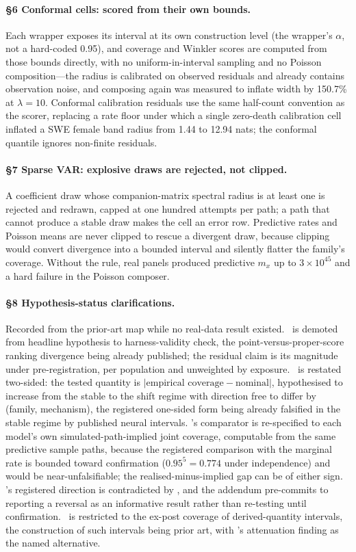 \paragraph{\S6 Conformal cells: scored from their own bounds.} Each wrapper
exposes its interval at its own construction level (the wrapper's $\alpha$,
not a hard-coded 0.95), and coverage and Winkler scores are computed from
those bounds directly, with no uniform-in-interval sampling and no Poisson
composition---the radius is calibrated on observed residuals and already
contains observation noise, and composing again was measured to inflate width
by 150.7\% at $\lambda=10$. Conformal calibration residuals use the same
half-count convention as the scorer, replacing a rate floor under which a
single zero-death calibration cell inflated a SWE female band radius from
1.44 to 12.94 nats; the conformal quantile ignores non-finite residuals.

\paragraph{\S7 Sparse VAR: explosive draws are rejected, not clipped.} A
coefficient draw whose companion-matrix spectral radius is at least one is
rejected and redrawn, capped at one hundred attempts per path; a path that
cannot produce a stable draw makes the cell an error row. Predictive rates and
Poisson means are never clipped to rescue a divergent draw, because clipping
would convert divergence into a bounded interval and silently flatter the
family's coverage. Without the rule, real panels produced predictive $m_x$ up
to $3\times10^{45}$ and a hard failure in the Poisson composer.

\paragraph{\S8 Hypothesis-status clarifications.} Recorded from the prior-art
map while no real-data result existed. \Hone\ is demoted from headline
hypothesis to harness-validity check, the point-versus-proper-score ranking
divergence being already published; the residual claim is its magnitude under
pre-registration, per population and unweighted by exposure. \Htwo\ is
restated two-sided: the tested quantity is
$|\text{empirical coverage}-\text{nominal}|$, hypothesised to increase from
the stable to the shift regime with direction free to differ by (family,
mechanism), the registered one-sided form being already falsified in the
stable regime by published neural intervals. \Hthree's comparator is
re-specified to each model's own simulated-path-implied joint coverage,
computable from the same predictive sample paths, because the registered
comparison with the marginal rate is bounded toward confirmation
($0.95^5=0.774$ under independence) and would be near-unfalsifiable; the
realised-minus-implied gap can be of either sign. \Hfour's registered
direction is contradicted by \citet{dowd2010backtesting}, and the addendum
pre-commits to reporting a reversal as an informative result rather than
re-testing until confirmation. \Hfive\ is restricted to the ex-post coverage
of derived-quantity intervals, the construction of such intervals being prior
art, with \citet{cairns2011mortality}'s attenuation finding as the named
alternative.

